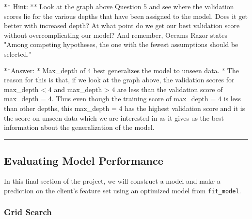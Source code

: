 \documentclass[11pt]{article}
\begin{document}
** Hint: ** Look at the graph above Question 5 and see where the
validation scores lie for the various depths that have been assigned to
the model. Does it get better with increased depth? At what point do we
get our best validation score without overcomplicating our model? And
remember, Occams Razor states "Among competing hypotheses, the one with
the fewest assumptions should be selected."

    **Answer: * Max\_depth of 4 best generalizes the model to unseen data. *
The reason for this is that, if we look at the graph above, the
validation scores for max\_depth \textless{} 4 and max\_depth
\textgreater{} 4 are less than the validation score of max\_depth = 4.
Thus even though the training score of max\_depth = 4 is less than other
depths, this max\_depth = 4 has the highest validation score and it is
the score on unseen data which we are interested in as it gives us the
best information about the generalization of the model.

    \begin{center}\rule{0.5\linewidth}{\linethickness}\end{center}

\subsection{Evaluating Model
Performance}\label{evaluating-model-performance}

In this final section of the project, we will construct a model and make
a prediction on the client's feature set using an optimized model from
\texttt{fit\_model}.

    \subsubsection{Grid Search}\label{grid-search}
\end{document}
